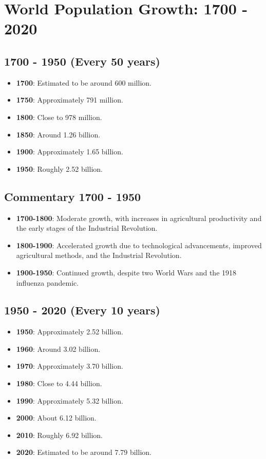 \section*{World Population Growth: 1700 - 2020}

\subsection*{1700 - 1950 (Every 50 years)}
\begin{itemize}
    \item \textbf{1700}: Estimated to be around 600 million.
    \item \textbf{1750}: Approximately 791 million.
    \item \textbf{1800}: Close to 978 million.
    \item \textbf{1850}: Around 1.26 billion.
    \item \textbf{1900}: Approximately 1.65 billion.
    \item \textbf{1950}: Roughly 2.52 billion.
\end{itemize}

\subsection*{Commentary 1700 - 1950}
\begin{itemize}
    \item \textbf{1700-1800}: Moderate growth, with increases in agricultural productivity and the early stages of the Industrial Revolution.
    \item \textbf{1800-1900}: Accelerated growth due to technological advancements, improved agricultural methods, and the Industrial Revolution.
    \item \textbf{1900-1950}: Continued growth, despite two World Wars and the 1918 influenza pandemic.
\end{itemize}

\subsection*{1950 - 2020 (Every 10 years)}
\begin{itemize}
    \item \textbf{1950}: Approximately 2.52 billion.
    \item \textbf{1960}: Around 3.02 billion.
    \item \textbf{1970}: Approximately 3.70 billion.
    \item \textbf{1980}: Close to 4.44 billion.
    \item \textbf{1990}: Approximately 5.32 billion.
    \item \textbf{2000}: About 6.12 billion.
    \item \textbf{2010}: Roughly 6.92 billion.
    \item \textbf{2020}: Estimated to be around 7.79 billion.
\end{itemize}

